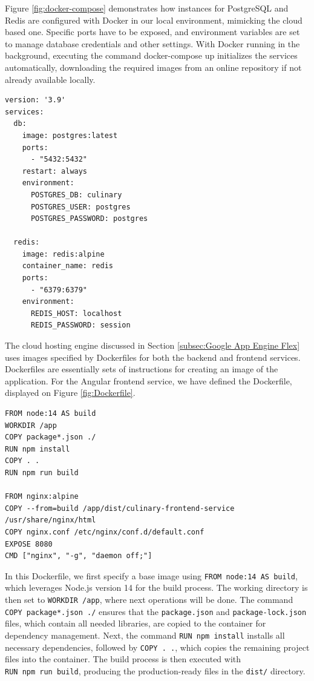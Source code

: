 Figure \ref{fig:docker-compose} demonstrates how instances for PostgreSQL and Redis are configured with Docker in our local environment, mimicking the cloud based one. Specific ports have to be exposed, and environment variables are set to manage database credentials and other settings. With Docker running in the background, executing the command docker-compose up initializes the services automatically, downloading the required images from an online repository if not already available locally.
{
\begin{verbatim}
version: '3.9'
services:
  db:
    image: postgres:latest
    ports:
      - "5432:5432"
    restart: always
    environment:
      POSTGRES_DB: culinary
      POSTGRES_USER: postgres
      POSTGRES_PASSWORD: postgres

  redis:
    image: redis:alpine
    container_name: redis
    ports:
      - "6379:6379"
    environment:
      REDIS_HOST: localhost
      REDIS_PASSWORD: session
\end{verbatim}
\label{fig:docker-compose}
}
The cloud hosting engine discussed in Section \ref{subsec:Google App Engine Flex} uses images specified by Dockerfiles for both the backend and frontend services. Dockerfiles are essentially sets of instructions for creating an image of the application. For the Angular frontend service, we have defined the Dockerfile, displayed on Figure \ref{fig:Dockerfile}.
{
\begin{verbatim}
FROM node:14 AS build
WORKDIR /app
COPY package*.json ./
RUN npm install
COPY . .
RUN npm run build

FROM nginx:alpine
COPY --from=build /app/dist/culinary-frontend-service /usr/share/nginx/html
COPY nginx.conf /etc/nginx/conf.d/default.conf
EXPOSE 8080
CMD ["nginx", "-g", "daemon off;"]
\end{verbatim}
\label{fig:Dockerfile}
} 

In this Dockerfile, we first specify a base image using \texttt{FROM~node:14~AS~build}, which leverages Node.js version 14 for the build process. The working directory is then set to \texttt{WORKDIR~/app}, where next operations will be done. The command \texttt{COPY~package*.json~./} ensures that the \texttt{package.json} and \texttt{package-lock.json} files, which contain all needed libraries, are copied to the container for dependency management. Next, the command \texttt{RUN~npm~install} installs all necessary dependencies, followed by \texttt{COPY~.~.}, which copies the remaining project files into the container. The build process is then executed with \texttt{RUN~npm~run~build}, producing the production-ready files in the \texttt{dist/} directory.

